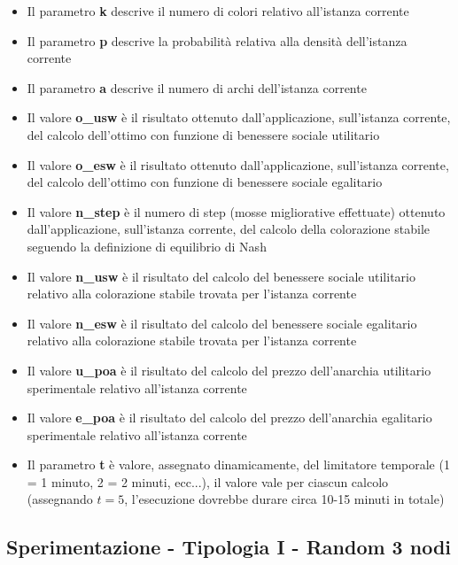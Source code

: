 \begin{itemize}
	\item Il parametro \textbf{k} descrive il numero di colori relativo all'istanza corrente
	\item Il parametro \textbf{p} descrive la probabilità relativa alla densità dell'istanza corrente
	\item Il parametro \textbf{a} descrive il numero di archi dell'istanza corrente
	\item Il valore \textbf{o\_usw} è il risultato ottenuto dall'applicazione, sull'istanza corrente, del calcolo dell'ottimo con funzione di benessere sociale utilitario
	\item Il valore \textbf{o\_esw} è il risultato ottenuto dall'applicazione, sull'istanza corrente, del calcolo dell'ottimo con funzione di benessere sociale egalitario
	\item Il valore \textbf{n\_step} è il numero di step (mosse migliorative effettuate) ottenuto dall'applicazione, sull'istanza corrente, del calcolo della colorazione stabile seguendo la definizione di equilibrio di Nash
	\item Il valore \textbf{n\_usw} è il risultato del calcolo del benessere sociale utilitario relativo alla colorazione stabile trovata per l'istanza corrente
	\item Il valore \textbf{n\_esw} è il risultato del calcolo del benessere sociale egalitario relativo alla colorazione stabile trovata per l'istanza corrente
	\item Il valore \textbf{u\_poa} è il risultato del calcolo del prezzo dell'anarchia utilitario sperimentale relativo all'istanza corrente
	\item Il valore \textbf{e\_poa} è il risultato del calcolo del prezzo dell'anarchia egalitario sperimentale relativo all'istanza corrente
	\item Il parametro \textbf{t} è valore, assegnato dinamicamente, del limitatore temporale (1 = 1 minuto, 2 = 2 minuti, ecc...), il valore vale per ciascun calcolo (assegnando \(t = 5\), l'esecuzione dovrebbe durare circa 10-15 minuti in totale)
\end{itemize}


\subsection{Sperimentazione - Tipologia I - Random 3 nodi}

